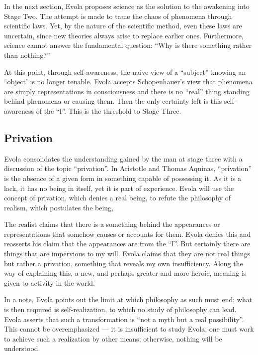 In the next section, Evola proposes science as the solution to the awakening into Stage Two. The attempt is made to tame the chaos of phenomena through scientific laws. Yet, by the nature of the scientific method, even these laws are uncertain, since new theories always arise to replace earlier ones. Furthermore, science cannot answer the fundamental question: ``Why is there something rather than nothing?''

At this point, through self-awareness, the naive view of a ``subject'' knowing an ``object' is no longer tenable. Evola accepts Schopenhauer's view that phenomena are simply representations in consciousness and there is no ``real'' thing standing behind phenomena or causing them. Then the only certainty left is this self-awareness of the ``I''. This is the threshold to Stage Three.


\subsection*{Privation}

Evola consolidates the understanding gained by the man at stage three with a discussion of the topic ``privation''. In Aristotle and Thomas Aquinas, ``privation'' is the absence of a given form in something capable of possessing it. As it is a lack, it has no being in itself, yet it is part of experience. Evola will use the concept of privation, which denies a real being, to refute the philosophy of realism, which postulates the being,

The realist claims that there is a something behind the appearances or representations that somehow causes or accounts for them. Evola denies this and reasserts his claim that the appearances are from the ``I''. But certainly there are things that are impervious to my will. Evola claims that they are not real things but rather a privation, something that reveals my own insufficiency. Along the way of explaining this, a new, and perhaps greater and more heroic, meaning is given to activity in the world.

In a note, Evola points out the limit at which philosophy as such must end; what is then required is self-realization, to which no study of philosophy can lead. Evola asserts that such a transformation is ``not a myth but a real possibility''. This cannot be overemphasized --- it is insufficient to study Evola, one must work to achieve such a realization by other means; otherwise, nothing will be understood.

